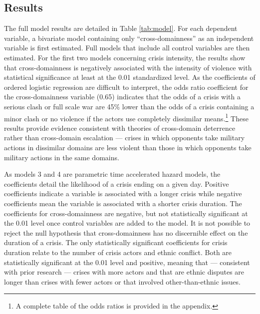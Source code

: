 \documentclass[
]{article}
\begin{document}
\hypertarget{results}{%
\subsection{Results}\label{results}}

The full model results are detailed in Table \ref{tab:model}. For each dependent variable, a bivariate model containing only ``cross-domainness'' as an independent variable is first estimated. Full models that include all control variables are then estimated. For the first two models concerning crisis intensity, the results show that cross-domainness is negatively associated with the intensity of violence with statistical significance at least at the 0.01 standardized level. As the coefficients of ordered logistic regression are difficult to interpret, the odds ratio coefficient for the cross-domainness variable (0.65) indicates that the odds of a crisis with a serious clash or full scale war are 45\% lower than the odds of a crisis containing a minor clash or no violence if the actors use completely dissimilar means.\footnote{A complete table of the odds ratios is provided in the appendix.} These results provide evidence consistent with theories of cross-domain deterrence rather than cross-domain escalation --- crises in which opponents take military actions in dissimilar domains are less violent than those in which opponents take military actions in the same domains.

As models 3 and 4 are parametric time accelerated hazard models, the coefficients detail the likelihood of a crisis ending on a given day. Positive coefficients indicate a variable is associated with a longer crisis while negative coefficients mean the variable is associated with a shorter crisis duration. The coefficients for cross-domainness are negative, but not statistically significant at the 0.01 level once control variables are added to the model. It is not possible to reject the null hypothesis that cross-domainness has no discernible effect on the duration of a crisis. The only statistically significant coefficients for crisis duration relate to the number of crisis actors and ethnic conflict. Both are statistically significant at the 0.01 level and positive, meaning that --- consistent with prior research --- crises with more actors and that are ethnic disputes are longer than crises with fewer actors or that involved other-than-ethnic issues.
\end{document}

